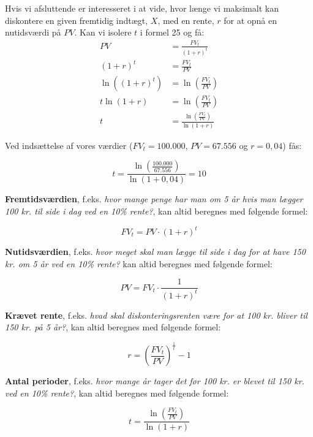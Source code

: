 \documentclass[10pt,reqno, usenames]{article}
\begin{document}
\begin{tcolorbox}[breakable, colback=red!5!white, colframe=red!50!black, title= Eksempel 1: Brug af fremtidsværdiligningen]
Hvis vi afsluttende er interesseret i at vide, hvor længe vi maksimalt kan diskontere en given fremtidig indtægt, $X$, med en rente, $r$ for at opnå en nutidsværdi på $PV$. Kan vi isolere $t$ i formel 25 og få: 
\begin{align}
PV &= \frac{FV_t}{(1 + r)^t} \nonumber \\
(1 + r)^t &= \frac{FV_t}{PV} \nonumber \\
\ln((1 + r)^t) &= \ln\left(\frac{FV_t}{PV}\right) \nonumber \\
t \ln(1 + r) &= \ln\left(\frac{FV_t}{PV}\right) \nonumber \\
t &= \frac{\ln\left(\frac{FV_t}{PV}\right)}{\ln(1 + r)}
\end{align}

Ved indsættelse af vores værdier ($FV_t = 100.000$, $PV = 67.556$ og $r=0,04$) fås: 

\begin{equation*}
    t = \frac{\ln(\frac{100.000}{67.556})}{\ln(1+0,04)} = 10
\end{equation*}
\end{tcolorbox}

\newpage
\textbf{Fremtidsværdien}, f.eks. \textit{hvor mange penge har man om 5 år hvis man lægger 100 kr. til side i dag ved en 10\% rente?}, kan altid beregnes med følgende formel: 

\begin{equation}
    FV_t = PV \cdot (1+r)^t 
\end{equation}

\textbf{Nutidsværdien}, f.eks. \textit{hvor meget skal man lægge til side i dag for at have 150 kr. om 5 år ved en 10\% rente?} kan altid beregnes med følgende formel: 

\begin{equation}
    PV = FV_t \cdot \frac{1}{(1+r)^t}
\end{equation}

\textbf{Krævet rente}, f.eks. \textit{hvad skal diskonteringsrenten være for at 100 kr. bliver til 150 kr. på 5 år?}, kan altid beregnes med følgende formel: 

\begin{equation}
    r = \left(\frac{FV_t}{PV}\right)^{\frac{1}{t}} - 1
\end{equation}

\textbf{Antal perioder}, f.eks. \textit{hvor mange år tager det før 100 kr. er blevet til 150 kr. ved en 10\% rente?}, kan altid beregnes med følgende formel: 

\begin{equation}
    t = \frac{\ln\left(\frac{FV_t}{PV}\right)}{\ln(1 + r)}
\end{equation}
\end{document}
